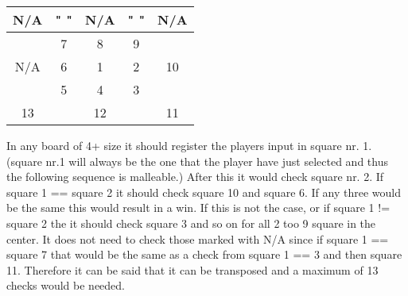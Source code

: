 \documentclass[a4paper,10pt]{article}
\begin{document}
	\centering
	\begin{tabular}{|c|c|c|c|c|}
		\hline 
		N/A &"    "& N/A &"    "& N/A \\ 
		\hline 
		& 7 & 8 & 9 &   \\ 
		\hline 
		N/A & 6 & 1 & 2 & 10 \\ 
		\hline 
		& 5 & 4 & 3 &  \\ 
		\hline 
		13 &    & 12 &    & 11 \\ 
		\hline 
	\end{tabular} 
	
	
	\flushleft
	
	In any board of 4+ size it should register the players input in square nr. 1. (square nr.1 will always be the one that the player have just selected and thus the following sequence is malleable.) After this it would check square nr. 2. If square 1 == square 2 it should check square 10 and square 6. If any three would be the same this would result in a win. If this is not the case, or if square 1 != square 2 the it should check square 3 and so on for all 2 too 9 square in the center. It does not need to check those marked with N/A since if  square 1 == square 7 that would be the same as a check from square 1 == 3 and then square 11. Therefore it can be said that it can be transposed and a maximum of 13 checks would be needed.  
	
	
	\begin{comment}
	Hvis Fern Time er lavet tilføjes det her og begin og end comment skal fjernes. 
	\textbf{Fern program}
	
	
	\end{comment}
	
\end{document}
